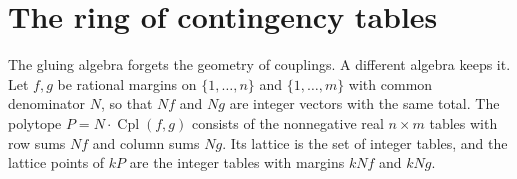 \documentclass[11pt]{article}
\theoremstyle{definition}
\theoremstyle{remark}
\newcommand{\Cpl}{\operatorname{Cpl}}
\begin{document}
\section{The ring of contingency tables}\label{sec:tables}

The gluing algebra forgets the geometry of couplings. A different algebra keeps it. Let $f,g$ be rational margins on
$\{1,\dots,n\}$ and $\{1,\dots,m\}$ with common denominator $N$, so that $Nf$ and $Ng$ are integer vectors with the same total.
The polytope $P=N\cdot\Cpl(f,g)$ consists of the nonnegative real $n\times m$ tables with row sums $Nf$ and column sums $Ng$.
Its lattice is the set of integer tables, and the lattice points of $kP$ are the integer tables with margins $kNf$ and
$kNg$.
\end{document}
